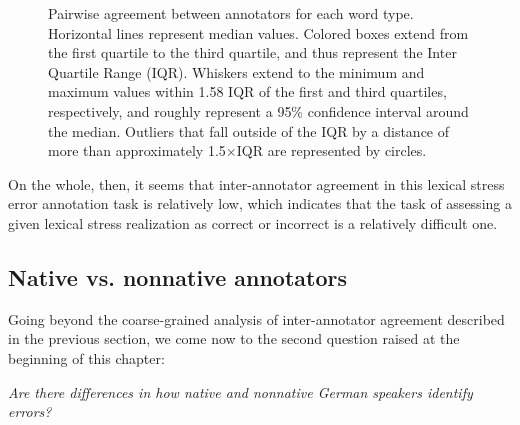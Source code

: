 \begin{figure}[phtb]
			\vspace{1em}	
			
			
			\caption[Pairwise agreement statistics by word type]{Pairwise agreement between annotators for each word type. 	
			Horizontal lines represent median values. Colored boxes extend from the first quartile to the third quartile, and thus represent the Inter Quartile Range (IQR). Whiskers extend to the minimum and maximum values within 1.58 IQR of the first and third quartiles, respectively, and roughly represent a 95\% confidence interval around the median. 
			 Outliers that fall outside of the IQR by a distance of more than approximately 1.5$\times$IQR  are represented by circles.
			}

			
			
			\label{fig:agreement:words}
		\end{figure}
		
		
	
		
		 On the whole, then, it seems that inter-annotator agreement in this lexical stress error annotation task is relatively low, which indicates that the task of assessing a given lexical stress realization as correct or incorrect is a relatively difficult one. 
	
	
		\subsection{Native vs. nonnative annotators}
		\label{sec:agreement:native}

		
		
		Going beyond the coarse-grained analysis of inter-annotator agreement described in the previous section, we come now to the second question raised at the beginning of this chapter:
		
		\textit{Are there differences in how native and nonnative German speakers identify errors?}
		

